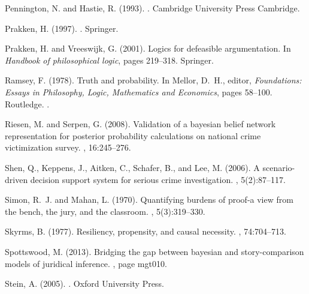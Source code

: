 \documentclass[10pt,leqno]{article}
\begin{document}
\begin{thebibliography}{}
Pennington, N. and Hastie, R. (1993).
.
\newblock Cambridge University Press Cambridge.

Prakken, H. (1997).
.
\newblock Springer.

Prakken, H. and Vreeswijk, G. (2001).
\newblock Logics for defeasible argumentation.
\newblock In {\em Handbook of philosophical logic}, pages 219--318. Springer.

Ramsey, F. (1978).
\newblock Truth and probability.
\newblock In Mellor, D.~H., editor, {\em Foundations: Essays in Philosophy,
  Logic, Mathematics and Economics}, pages 58--100. Routledge.
.

Riesen, M. and Serpen, G. (2008).
\newblock Validation of a bayesian belief network representation for posterior
  probability calculations on national crime victimization survey.
, 16:245--276.

Shen, Q., Keppens, J., Aitken, C., Schafer, B., and Lee, M. (2006).
\newblock A scenario-driven decision support system for serious crime
  investigation.
, 5(2):87--117.

Simon, R.~J. and Mahan, L. (1970).
\newblock Quantifying burdens of proof-a view from the bench, the jury, and the
  classroom.
, 5(3):319--330.

Skyrms, B. (1977).
\newblock Resiliency, propensity, and causal necessity.
, 74:704--713.

Spottswood, M. (2013).
\newblock Bridging the gap between bayesian and story-comparison models of
  juridical inference.
, page mgt010.

Stein, A. (2005).
.
\newblock Oxford University Press.


\end{thebibliography}
\end{document}
